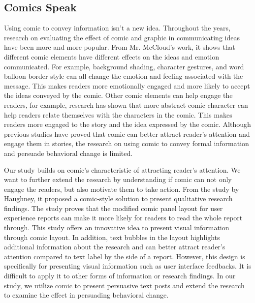 \subsection{Comics Speak}
Using comic to convey information isn't a new idea. Throughout the years, research on evaluating the effect of comic and graphic in communicating ideas have been more and more popular. From Mr. McCloud's work, it shows that different comic elements have different effects on the ideas and emotion communicated. For example, background shading, character gestures, and word balloon border style can all change the emotion and feeling associated with the message. This makes readers more emotionally engaged and more likely to accept the ideas conveyed by the comic. Other comic elements can help engage the readers, for example, research has shown that more abstract comic character can help readers relate themselves with the characters in the comic. This makes readers more engaged to the story and the idea expressed by the comic. Although previous studies have proved that comic can better attract reader's attention and engage them in stories, the research on using comic to convey formal information and persuade behavioral change is limited.\par
Our study builds on comic's characteristic of attracting reader's attention. We want to further extend the research by understanding if comic can not only engage the readers, but also motivate them to take action. From the study by Haughney, it proposed a comic-style solution to present qualitative research findings. The study proves that the modified comic panel layout for user experience reports can make it more likely for readers to read the whole report through. This study offers an innovative idea to present visual information through comic layout. In addition, text bubbles in the layout highlights additional information about the research and can better attract reader's attention compared to text label by the side of a report. However, this design is specifically for presenting visual information such as user interface feedbacks. It is difficult to apply it to other forms of information or research findings. In our study, we utilize comic to present persuasive text posts and extend the research to examine the effect in persuading behavioral change.\par
